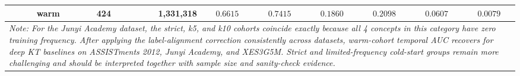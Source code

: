 \begin{table}[tbp]
{\begin{tabular}{lllcrcccccc}
 &  & warm & 424 & 1,331,318 & $0.6615$ & $0.7415$ & $0.1860$ & $0.2098$ & $0.0607$ & $0.0079$ \\
\bottomrule
\multicolumn{11}{p{8.2cm}}{\scriptsize \textit{Note: For the Junyi Academy dataset, the strict, k5, and k10 cohorts coincide exactly because all 4 concepts in this category have zero training frequency. After applying the label-alignment correction consistently across datasets, warm-cohort temporal AUC recovers for deep KT baselines on ASSISTments 2012, Junyi Academy, and XES3G5M. Strict and limited-frequency cold-start groups remain more challenging and should be interpreted together with sample size and sanity-check evidence.}} \\
\end{tabular}%
}
\end{table}
